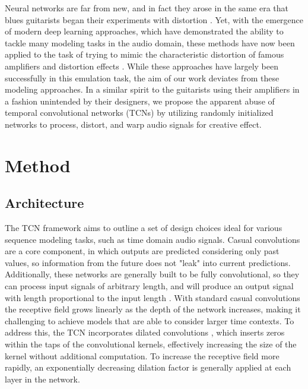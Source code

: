 \documentclass{article}
\begin{document}
Neural networks are far from new, and in fact they arose in the same era that blues guitarists began their experiments with distortion \cite{schmidhuber2015deep}.
Yet, with the emergence of modern deep learning approaches, which have demonstrated the ability to tackle many modeling tasks in the audio domain,
these methods have now been applied to the task of trying to mimic the characteristic distortion of famous amplifiers and distortion effects 
\cite{covert2013rnn, schmitz2018nonlinear, zhang2018lstm, damskagg2019distortion, martinez2019nonlinear}.
While these approaches have largely been successfully in this emulation task, the aim of our work deviates from these modeling approaches.
In a similar spirit to the guitarists using their amplifiers in a fashion unintended by their designers,
we propose the apparent abuse of temporal convolutional networks (TCNs) \cite{bai2018tcn} by utilizing randomly initialized networks 
to process, distort, and warp audio signals for creative effect. 

\section{Method}
\subsection{Architecture}

The TCN framework aims to outline a set of design choices ideal for various sequence modeling tasks, such as time domain audio signals. 
Casual convolutions are a core component, in which outputs are predicted considering only past values,
so information from the future does not "leak" into current predictions. 
Additionally, these networks are generally built to be fully convolutional, 
so they can process input signals of arbitrary length, and will produce an output signal with length proportional to the input length \cite{long2015fcn}.
With standard casual convolutions the receptive field grows linearly as the depth of the network increases, 
making it challenging to achieve models that are able to consider larger time contexts. 
To address this, the TCN incorporates dilated convolutions \cite{oord2016wavenet}, 
which inserts zeros within the taps of the convolutional kernels, effectively increasing the size of the kernel without additional computation. 
To increase the receptive field more rapidly, an exponentially decreasing dilation factor is generally applied at each layer in the network. 
\end{document}
